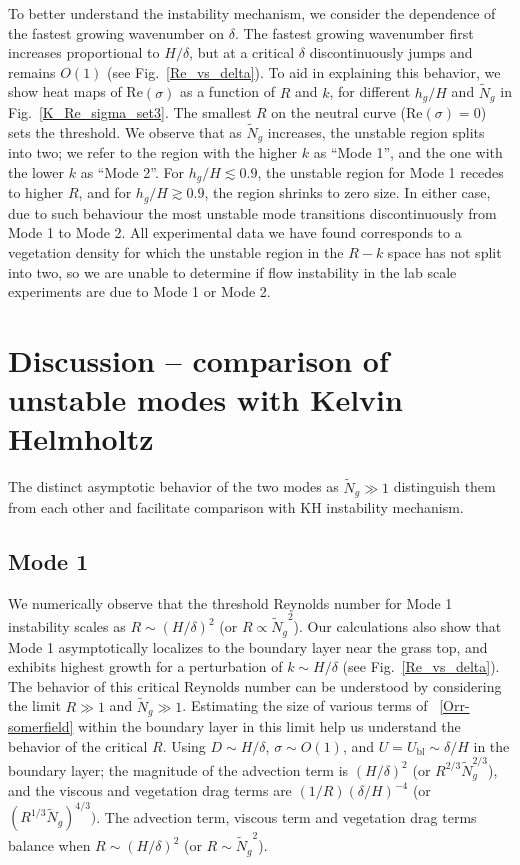 \documentclass{jfm}
\newcommand{\hg}{h_g}
\renewcommand{\Rey}{{R}}
\newcommand{\Ndg}{\tilde{N}_g}
\newcommand{\ubl}{U_\text{bl}}
\newcommand{\revise}[1]{{{#1}}}
\begin{document}
To better understand the instability mechanism, we consider the dependence of the fastest growing wavenumber on $\delta$.
The fastest growing wavenumber first increases proportional to $H/\delta$, but at a critical $\delta$ discontinuously jumps and remains $O(1)$ (see Fig.~\ref{Re_vs_delta}). 
To aid in explaining this behavior, we show heat maps of Re$(\sigma)$ as a function of $\Rey$ and $k$, for different $\hg/H$ and $\Ndg$ in Fig.~\ref{K_Re_sigma_set3}. 
The smallest $\Rey$ on the neutral curve (Re$(\sigma)=0$) sets the threshold. 
We observe that as $\Ndg$ increases, the unstable region splits into two; we refer to the region with the higher $k$ as ``Mode 1'', and the one with the lower $k$ as ``Mode 2''. 
For $\hg/H\lesssim 0.9$, the unstable region for Mode 1 recedes to higher $\Rey$, and for $\hg/H \gtrsim 0.9$, the region shrinks to zero size.
In either case, due to such behaviour the most unstable mode transitions discontinuously from Mode 1 to Mode 2.
\revise{All experimental data we have found corresponds to a vegetation density for which the unstable region in the $\Rey-k$ space has not split into two, so we are unable to determine if flow instability in the lab scale experiments \citep{Ghisal02} are due to Mode 1 or Mode 2.}

\section{Discussion -- comparison of unstable modes with Kelvin Helmholtz}
The distinct asymptotic behavior of the two modes as $\Ndg \gg 1$ distinguish them from each other and facilitate comparison with KH instability mechanism. 
\subsection{Mode 1}
We numerically observe that the threshold Reynolds number for Mode 1 instability scales as  $\Rey \sim (H/\delta)^2$ (or $\Rey \propto {\Ndg}^{2}$). 
Our calculations also show that Mode 1 asymptotically localizes to the boundary layer near the grass top, and exhibits highest growth for a perturbation of  $k \sim H/\delta$ (see Fig.~\ref{Re_vs_delta}). 
The behavior of this critical Reynolds number can be understood by considering the limit $\Rey \gg 1$ and $\Ndg \gg 1$.
Estimating the size of various terms of ~\eqref{Orr-somerfield} within the boundary layer in this limit help us understand the behavior of the critical $\Rey$. 
Using $D\sim H/\delta$, $\sigma \sim O(1)$, and $U=\ubl \sim \delta/H$ in the boundary layer; the magnitude of the advection term is $ (H/\delta)^2$  (or $\Rey^{2/3} \Ndg^{2/3}$), and the viscous and vegetation drag terms are $(1/\Rey) (\delta/H)^{-4}$ (or $(\Rey^{1/3} \Ndg)^{4/3})$. 
The advection term, viscous term and vegetation drag terms balance when $\Rey \sim (H/\delta)^2$ (or $\Rey \sim {\Ndg}^{2}$).
\end{document}
